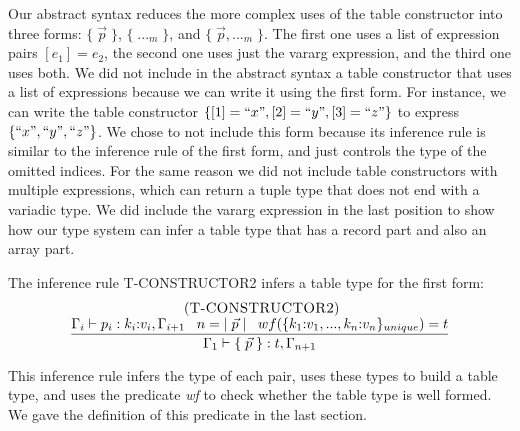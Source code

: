 Our abstract syntax reduces the more complex uses of the table
constructor into three forms: $\{\;\vec{p}\;\}$, $\{\;{...}_{m}\;\}$,
and $\{\;\vec{p},{...}_{m}\;\}$.
The first one uses a list of expression pairs $[e_{1}] = e_{2}$,
the second one uses just the vararg expression, and the third one uses both.
We did not include in the abstract syntax a table constructor
that uses a list of expressions because we can write it using the first form.
For instance, we can write the table constructor
$\{ [1] = ``x", [2] = ``y", [3] = ``z" \}$ to express $\{ ``x", ``y", ``z" \}$.
We chose to not include this form because its inference rule is similar
to the inference rule of the first form, and just controls the type of
the omitted indices.
For the same reason we did not include table constructors with
multiple expressions, which can return a tuple type that does not end
with a variadic type.
We did include the vararg expression in the last position to show how
our type system can infer a table type that has a record part and
also an array part.

The inference rule \textsc{T-CONSTRUCTOR2} infers a table type for
the first form:
\[
\begin{array}{c}
\; (\textsc{T-CONSTRUCTOR2})\\
\dfrac{\Gamma_{i} \vdash p_{i}:k_{i}{:}v_{i}, \Gamma_{i+1} \;\;\;
       n = |\;\vec{p}\;| \;\;\;
       wf(\{k_{1}{:}v_{1}, ..., k_{n}{:}v_{n}\}_{unique}) = t}
      {\Gamma_{1} \vdash \{\;\vec{p}\;\}:t, \Gamma_{n+1}}
\end{array}
\]

This inference rule infers the type of each pair, uses these types
to build a table type, and uses the predicate \emph{wf} to check
whether the table type is well formed.
We gave the definition of this predicate in the last section.

